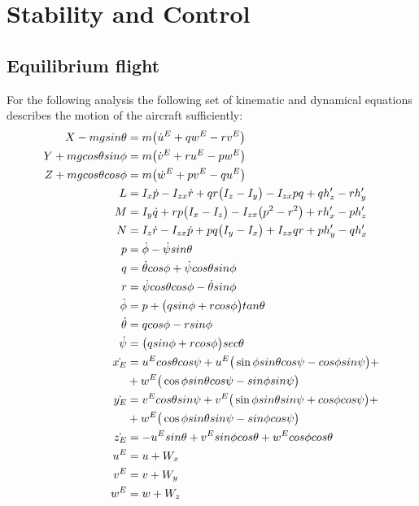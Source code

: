 \section{Stability and Control}

%
%
%

\subsection{Equilibrium flight}
For the following analysis the following set of kinematic and dynamical
equations describes the motion of the aircraft sufficiently:
\begin{align}
    X - mgsin\theta &= m\big(\dot{u}^E + qw^E - rv^E \big)
    \label{full_longitudinal1}\\
    Y + mgcos\theta sin\phi &= m\bigl(\dot{v}^E+ ru^E - pw^E\bigr)\\
    Z + mgcos\theta cos\phi &= m\big(\dot{w}^E+ pv^E - qu^E\bigr)
    \label{full_longitudinal3}\\
    L &= I_x\dot{p} - I_{zx}\dot{r} + qr\bigl(I_z - I_y\bigr) - I_{zx}pq + qh_z' -
    rh_y'\\
    M &= I_y\dot{q} + rp\bigl(I_x - I_z\bigr)- I_{zx}\bigl(p^2-r^2\bigr) + rh_x' -
    ph_z'\\
    N &= I_z\dot{r} - I_{zx}\dot{p} + pq\bigl(I_y - I_x\bigr) + I_{zx}qr + ph_y'-qh_x'\\
    p &= \dot{\phi} - \dot{\psi}sin\theta\\
    q &= \dot{\theta}cos\phi + \dot{\psi}cos\theta sin\phi\\
    r &= \dot{\psi}cos\theta cos\phi- \dot{\theta} sin\phi \\
    \dot{\phi} &= p + \bigl(qsin\phi+ rcos\phi\bigr)tan\theta\\
    \dot{\theta} &= qcos\phi - rsin\phi\\
    \dot{\psi} &= \bigl(qsin\phi + rcos\phi\bigr)sec\theta\\
    \dot{x_E} &= u^Ecos\theta cos\psi + u^E\big(\sin\phi sin\theta cos\psi -
    cos\phi sin\psi\big) + \notag\\
     &+ w^E\big(\cos\phi sin\theta cos\psi - sin\phi sin\psi\big) \\
    \dot{y_E} &= v^Ecos\theta sin\psi + v^E\big(\sin\phi sin\theta sin\psi +
    cos\phi cos\psi\big) + \notag\\
     &+ w^E\big(\cos\phi sin\theta sin\psi - sin\phi cos\psi\big) \\
    \dot{z_E} &= -u^Esin\theta + v^Esin\phi cos\theta + w^Ecos\phi cos\theta
    \label{full_longitudinal15}\\
    u^E &= u + W_x\\
    v^E &= v + W_y\\
    w^E &= w + W_z \label{full_longitudinal18}
\end{align}

